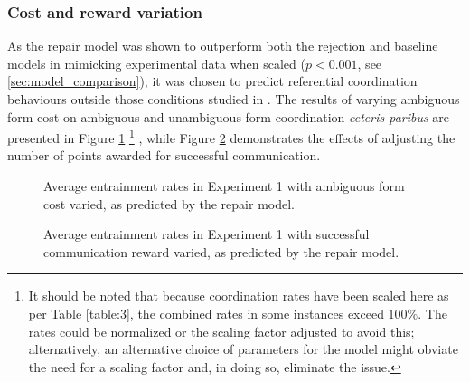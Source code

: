 \documentclass[12pt,a4paper]{article}
\begin{document}
\subsubsection{Cost and reward variation}
As the repair model was shown to outperform both the rejection and baseline models in mimicking experimental data when scaled ($p<0.001$, see \ref{sec:model_comparison}), it was chosen to predict referential coordination behaviours outside those conditions studied in \citeauthor{rohde2012}. The results of varying ambiguous form cost on ambiguous and unambiguous form coordination \textit{ceteris paribus} are presented in Figure \ref{fig:3}
\footnote{It should be noted that because coordination rates have been scaled here as per Table \ref{table:3}, the combined rates in some instances exceed $100\%$. The rates could be normalized or the scaling factor adjusted to avoid this; alternatively, an alternative choice of parameters for the model might obviate the need for a scaling factor and, in doing so, eliminate the issue.}
, while Figure \ref{fig:4} demonstrates the effects of adjusting the number of points awarded for successful communication.

\begin{figure}
\centering
\scalebox{.725}{}
\caption{Average entrainment rates in Experiment 1 with ambiguous form cost varied, as predicted by the repair model.}
\label{fig:3}
\end{figure}

\begin{figure}
\centering
\scalebox{.725}{}
\caption{Average entrainment rates in Experiment 1 with successful communication reward varied, as predicted by the repair model.}
\label{fig:4}
\end{figure}
\end{document}
